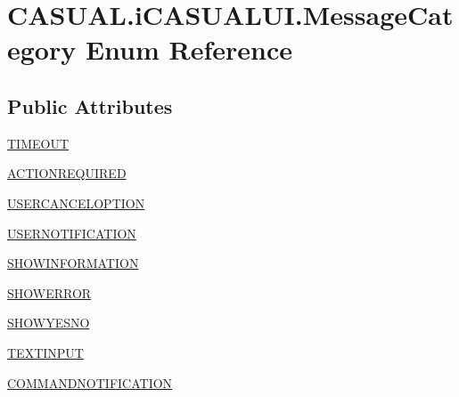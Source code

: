 \hypertarget{enum_c_a_s_u_a_l_1_1i_c_a_s_u_a_l_u_i_1_1_message_category}{\section{C\-A\-S\-U\-A\-L.\-i\-C\-A\-S\-U\-A\-L\-U\-I.\-Message\-Category Enum Reference}
\label{enum_c_a_s_u_a_l_1_1i_c_a_s_u_a_l_u_i_1_1_message_category}
}
\subsection*{Public Attributes}
\begin{DoxyCompactItemize}
\item 
\hyperlink{enum_c_a_s_u_a_l_1_1i_c_a_s_u_a_l_u_i_1_1_message_category_a052e8f1962d3780aea7b22735a3c8598}{T\-I\-M\-E\-O\-U\-T}
\item 
\hyperlink{enum_c_a_s_u_a_l_1_1i_c_a_s_u_a_l_u_i_1_1_message_category_a825f388cc65b770639a7324b05eec1a6}{A\-C\-T\-I\-O\-N\-R\-E\-Q\-U\-I\-R\-E\-D}
\item 
\hyperlink{enum_c_a_s_u_a_l_1_1i_c_a_s_u_a_l_u_i_1_1_message_category_a5f93cebc95232650869a6e81920cafcb}{U\-S\-E\-R\-C\-A\-N\-C\-E\-L\-O\-P\-T\-I\-O\-N}
\item 
\hyperlink{enum_c_a_s_u_a_l_1_1i_c_a_s_u_a_l_u_i_1_1_message_category_aec7dcf1fbd8c8165be2687ff7fe4a900}{U\-S\-E\-R\-N\-O\-T\-I\-F\-I\-C\-A\-T\-I\-O\-N}
\item 
\hyperlink{enum_c_a_s_u_a_l_1_1i_c_a_s_u_a_l_u_i_1_1_message_category_add2e1276bc1f8366f49eabc67c104def}{S\-H\-O\-W\-I\-N\-F\-O\-R\-M\-A\-T\-I\-O\-N}
\item 
\hyperlink{enum_c_a_s_u_a_l_1_1i_c_a_s_u_a_l_u_i_1_1_message_category_a360e19f6fe81428b3d1a269751dff818}{S\-H\-O\-W\-E\-R\-R\-O\-R}
\item 
\hyperlink{enum_c_a_s_u_a_l_1_1i_c_a_s_u_a_l_u_i_1_1_message_category_a1b9dee40a868eeaa007364d0f4f12ef4}{S\-H\-O\-W\-Y\-E\-S\-N\-O}
\item 
\hyperlink{enum_c_a_s_u_a_l_1_1i_c_a_s_u_a_l_u_i_1_1_message_category_a1c124540e1b340e6f8352e1ad940d623}{T\-E\-X\-T\-I\-N\-P\-U\-T}
\item 
\hyperlink{enum_c_a_s_u_a_l_1_1i_c_a_s_u_a_l_u_i_1_1_message_category_a9be1d1593cc106cb475f813830ef9199}{C\-O\-M\-M\-A\-N\-D\-N\-O\-T\-I\-F\-I\-C\-A\-T\-I\-O\-N}
\end{DoxyCompactItemize}


